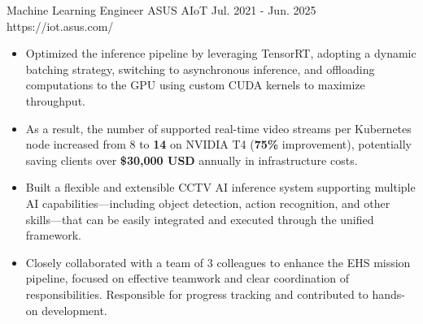 

\begin{cventries}

\cventryexp
{Machine Learning Engineer} %
{ASUS AIoT} %
{Jul. 2021 - Jun. 2025} %
{https://iot.asus.com/}
{
    \begin{cvitems} %
        \begin{itemize}
            \item Optimized the inference pipeline by leveraging TensorRT, adopting a 
            dynamic batching strategy, switching to asynchronous inference, and offloading 
            computations to the GPU using custom CUDA kernels to maximize throughput. 
            \item As a result, the number of supported real-time video streams per 
            Kubernetes node increased from 8 to \textbf{14} on NVIDIA T4 (\textbf{75\%} improvement), potentially 
            saving clients over \textbf{\$30,000 USD} annually in infrastructure costs.
        \end{itemize}
        \begin{itemize}
            \item Built a flexible and extensible CCTV AI inference system 
            supporting multiple AI capabilities—including object detection, 
            action recognition, and other skills—that can be easily integrated 
            and executed through the unified framework.
            \item Closely collaborated with a team of 3 colleagues to enhance the 
            EHS mission pipeline, focused on effective teamwork and clear coordination of 
            responsibilities. Responsible for progress tracking and contributed to hands-on 
            development.
        \end{itemize}

\end{cvitems}}
\end{cventries}
